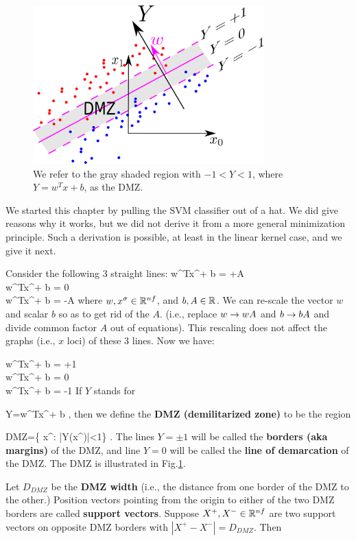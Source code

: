 \begin{figure}[h!]
\centering
\includegraphics[width=3.5in]
{svm/svm-dmz.png}
\caption{We refer to the gray shaded region
with $-1<Y<1$, where $Y= w^T x +b$,  
as the DMZ.}
\label{fig-svm-dmz}
\end{figure}

We started this
chapter by pulling the SVM classifier
out of a hat. We did give
reasons why it works, but we did not derive
it from a more general minimization
principle. Such a derivation
is possible, at least in the 
linear kernel case, and we give it next.


Consider the following 3 straight lines:
\beqa
w^Tx^\s + b = +A
\\
w^Tx^\s + b = 0
\\
w^Tx^\s + b = -A
\eeqa
where $w, x^\sigma\in { \mathbb{R}}^{nf}$, and $b,A\in { \mathbb{R}}$.
We can re-scale the vector $w$ and 
scalar $b$ so as to get rid of the $A$.
(i.e., replace $w\rightarrow wA$ and $b\rightarrow bA$
and divide common factor $A$ out of equations).
This rescaling does not
affect the graphs (i.e., $x$ loci)
of these 3 lines. Now we have:


\beqa
w^Tx^\s + b = +1
\\
w^Tx^\s + b = 0
\\
w^Tx^\s + b = -1
\eeqa
If $Y$ stands for

\beq
Y=w^Tx^\s + b
\;,
\eeq
then we define
the {\bf DMZ (demilitarized zone)}
to be the region 

\beq
DMZ=\{  x^\s: |Y(x^\s)|<1\}
\;.
\eeq
The lines $Y=\pm 1$
will be called the {\bf borders (aka margins)}
of the DMZ, and 
line $Y=0$
will be called the
{\bf line of demarcation}
of the DMZ.
The DMZ is illustrated in Fig.\ref{fig-svm-dmz}.

Let $D_{DMZ}$ be
the {\bf DMZ width} (i.e., 
the distance from one border
of the DMZ to the other.)
Position vectors 
 pointing 
from the origin to either 
of the two DMZ borders are called 
{\bf support vectors}.
Suppose $X^+, X^-\in { \mathbb{R}}^{nf}$
are two support vectors
on  opposite DMZ borders
with $|X^+-X^-|=D_{DMZ}$. Then 

